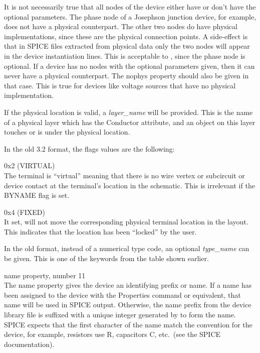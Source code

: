 \begin{description}
It is not necessarily true that all nodes of the device either have or
don't have the optional parameters.  The phase node of a Josephson
junction device, for example, does not have a physical counterpart. 
The other two nodes do have physical implementations, since these are
the physical connection points.  A side-effect is that in SPICE files
extracted from physical data only the two nodes will appear in the
device instantiation lines.  This is acceptable to {\WRspice},
since the phase node is optional.  If a device has no nodes with the
optional parameters given, then it can never have a physical
counterpart.  The {\et nophys} property should also be given in that
case.  This is true for devices like voltage sources that have no
physical implementation.

If the physical location is valid, a {\it layer\_name} will be provided. 
This is the name of a physical layer which has the {\et Conductor}
attribute, and an object on this layer touches or is under the
physical location.

In the old 3.2 format, the flags values are the following:
\begin{description}
\item{\vt 0x2} (VIRTUAL)\\
The terminal is ``virtual'' meaning that there is no wire vertex or
subcircuit or device contact at the terminal's location in the
schematic.  This is irrelevant if the BYNAME flag is set.

\item{\vt 0x4} (FIXED)\\
It set, {\Xic} will not move the corresponding physical terminal
location in the layout.  This indicates that the location has been
``locked'' by the user.
\end{description}

In the old format, instead of a numerical type code, an optional {\it
type\_name} can be given.  This is one of the keywords from the table
shown earlier.

\item{\et name} property, number 11\\
The {\et name} property gives the device an identifying prefix or
name.  If a name has been assigned to the device with the {\cb
Properties} command or equivalent, that name will be used in SPICE
output.  Otherwise, the name prefix from the device library file is
suffixed with a unique integer generated by {\Xic} to form the name. 
SPICE expects that the first character of the name match the
convention for the device, for example, resistors use R, capacitors C,
etc.~(see the SPICE documentation).


\end{description}

